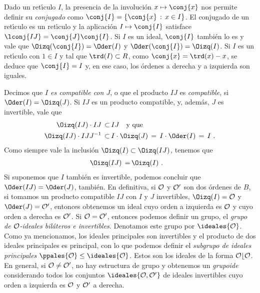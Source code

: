 Dado un ret\'{\i}culo $I$, la presencia de la involuci\'{o}n
$x\mapsto\conj{x}$ nos permite definir su \emph{conjugado} como
$\conj{I}=\{\conj{x}\,:\,x\in I\}$. El conjugado de un ret\'{\i}culo es
un ret\'{\i}culo y la aplicaci\'{o}n $I\mapsto\conj{I}$ satisface
$\lconj{IJ}=\conj{J}\conj{I}$. Si $I$ es un ideal, $\conj{I}$ tambi\'{e}n
lo es y vale que $\Oizq(\conj{I})=\Oder(I)$ y $\Oder(\conj{I})=\Oizq(I)$.
Si $I$ es un ret\'{\i}culo con $1\in I$ y tal que $\trd(I)\subset R$, como
$\conj{x}=\trd(x)-x$, se deduce que $\conj{I}=I$ y, en ese caso, los
\'{o}rdenes a derecha y a izquierda son iguales.

Decimos que \emph{$I$ es compatible con $J$}, o que el producto
$IJ$ es \emph{compatible}, si $\Oder(I)=\Oizq(J)$. Si $IJ$ es un producto
compatible, y, adem\'{a}s, $J$ es invertible, vale que
\begin{align*}
	\Oizq(IJ)\cdot IJ\,\subset\, & IJ\quad\text{y que} \\
	\Oizq(IJ)\cdot IJJ^{-1} \,\subset\, & I\cdot\Oizq(J)
	\,=\,I\cdot\Oder(I)\,=\,I
	\text{ .}
\end{align*}
%
Como siempre vale la inclusi\'{o}n $\Oizq(I)\subset\Oizq(IJ)$, tenemos que
\begin{align*}
	\Oizq(IJ) \,=\, & \Oizq(I)
	\text{ .}
\end{align*}
%
Si suponemos que $I$ tambi\'{e}n es invertible, podemos concluir que
$\Oder(IJ)=\Oder(J)$, tambi\'{e}n. En definitiva, si $\cal{O}$ y $\cal{O}'$
son dos \'{o}rdenes de $B$, si tomamos un producto compatible $IJ$
con $I$ y $J$ invertibles, $\Oizq(I)=\cal{O}$ y $\Oder(J)=\cal{O}'$,
entonces obtenemos un ideal cuyo orden a izquierda es $\cal{O}$ y
cuyo orden a derecha es $\cal{O}'$. Si $\cal{O}=\cal{O}'$, entonces
podemos definir un grupo, el \emph{grupo de $\cal{O}$-ideales bil\'{a}teros %
e invertibles}. Denotamos este grupo por $\ideales{\cal{O}}$. Como
ya mencionamos, los ideales principales son invertibles y el producto de
dos ideales principales es principal, con lo que podemos definir el
\emph{subgrupo de ideales principales} $\ppales{\cal{O}}\leq\ideales{\cal{O}}$.
Estos son los ideales de la forma $\cal{O}b\cal{O}$.
En general, si $\cal{O}\not =\cal{O}'$, no hay estructura de grupo
y obtenemos un \emph{grupoide} considerando todos los conjuntos
$\ideales{\cal{O},\cal{O}'}$ de ideales invertibles cuyo orden a izquierda
es $\cal{O}$ y $\cal{O}'$ a derecha.

